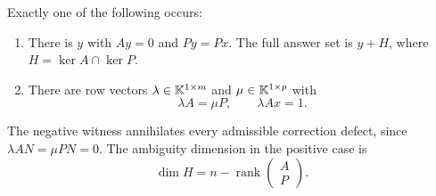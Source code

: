 \begin{KSproposition}\label{KS:KS57}
Exactly one of the following occurs:
\begin{enumerate}
\item There is \(y\) with \(Ay=0\) and \(Py=Px\). The full answer set is \(y+H\), where \(H=\ker A\cap\ker P\).
\item There are row vectors \(\lambda\in\mathbb K^{1\times m}\) and \(\mu\in\mathbb K^{1\times p}\) with
\[
 \lambda A=\mu P,\qquad\lambda Ax=1.
\]
\end{enumerate}
The negative witness annihilates every admissible correction defect, since \(\lambda AN=\mu PN=0\). The ambiguity dimension in the positive case is
\[
 \dim H=n-\operatorname{rank}\begin{pmatrix}A\\P\end{pmatrix}.
\]
\end{KSproposition}
